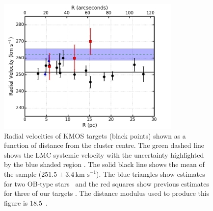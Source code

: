 \documentclass[useAMS,usenatbib]{mn2e}
\def\kms{$\mbox{km s}^{-1}$}
\begin{document}
\begin{figure}
 \includegraphics[width=9.0cm]{NGC2100-rv-v8}
 \caption{Radial velocities of KMOS targets (black points) shown as a function of distance from the cluster centre.
 The green dashed line shows the LMC systemic velocity with the uncertainty highlighted by the blue shaded region
 {\citep[$262.2\pm3.4$\,\kms;][]{2012AJ....144....4M}}.
 The solid black line shows the mean of the sample ($251.5\pm3.4\,$\kms).
 The blue triangles show estimates for two OB-type stars~\protect\citep{2015A&A...584A...5E} and the red squares show previous estimates for three of our targets
 {\citep{1994A&A...282..717J}}.
 The distance modulus used to produce this figure is 18.5~\citep{2015A&A...575A..62N}.
 \label{fig:rvs}}
\end{figure}
\end{document}
